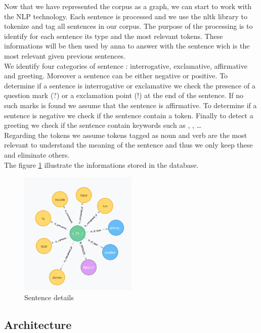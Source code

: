 Now that we have represented the corpus as a graph, we can start to work with the NLP technology. Each sentence is processed and we use the nltk library to tokenize and tag all sentences in our corpus. The purpose of the processing is to identify for each sentence its type and the most relevant tokens. These informations will be then used by anna to answer with the sentence wich is the most relevant given previous sentences.\\
We identify four categories of sentence : interrogative, exclamative, affirmative and greeting. Moreover a sentence can be either negative or positive. To determine if a sentence is interrogative or exclamative we check the presence of a question mark (?) or a exclamation point (!) at the end of the sentence. If no such marks is found we assume that the sentence is affirmative. To determine if a sentence is negative we check if the sentence contain a  token. Finally to detect a greeting we check if the sentence contain keywords such as , , \dots\\
Regarding the tokens we assume tokens tagged as noun and verb are the most relevant to understand the meaning of the sentence and thus we only keep these and eliminate others.\\
The figure \ref{fig:sent} illustrate the informations stored in the database.

\begin{figure}[!h]
\begin{center}
\includegraphics[width=0.5\textwidth]{./img/graph1711.png}
\end{center}
\caption{Sentence details}
\label{fig:sent}
\end{figure}

\subsection{Architecture}
\label{sub:Architecture}

